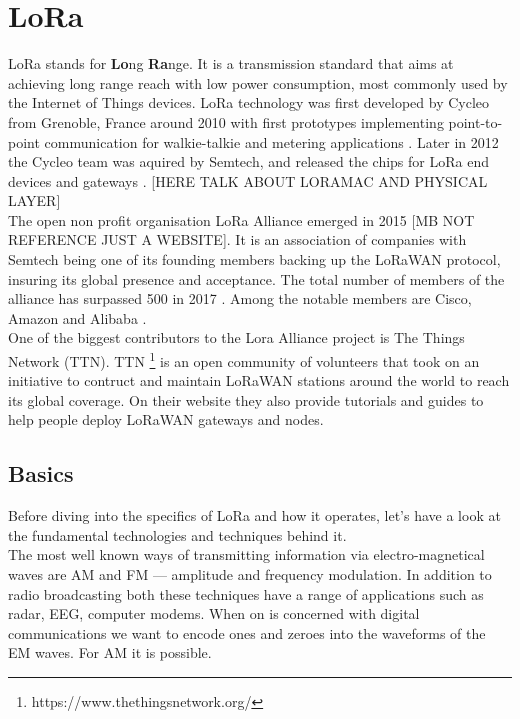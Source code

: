 \chapter{LoRa}

LoRa stands for \textbf{Lo}ng \textbf{Ra}nge. It is a transmission standard that aims at achieving long range reach with low power
consumption, most commonly used by the Internet of Things devices.
LoRa technology was first developed by Cycleo from Grenoble, France around 2010 with first prototypes implementing point-to-point communication for walkie-talkie and metering applications \cite{trinity_panel}. Later in 2012 the Cycleo team was aquired by Semtech, and released the chips for LoRa end devices and gateways \cite{origins}. [HERE TALK ABOUT LORAMAC AND PHYSICAL LAYER]\\

The open non profit organisation LoRa Alliance emerged in 2015\cite{alliance} [MB NOT REFERENCE JUST A WEBSITE]. 
It is an association of companies with Semtech being one of
its founding members \cite{alliance_founder} backing up the LoRaWAN protocol, insuring its
global presence and acceptance. The total number of members of the alliance has surpassed 500 in 2017 \cite{500_members}. Among the notable members are Cisco, Amazon and Alibaba \cite{alliance_members}.\\

One of the biggest contributors to the Lora Alliance project is The Things Network (TTN). TTN \footnote{https://www.thethingsnetwork.org/} is an open community of volunteers that took on an initiative to contruct and maintain LoRaWAN stations around the world to reach its global coverage. On their website they also provide tutorials and guides to help people deploy LoRaWAN gateways and nodes. 

\section{Basics}

Before diving into the specifics of LoRa and how it operates, let's have a look at the fundamental technologies and techniques behind it. \\

The most well known ways of transmitting information 
via electro-magnetical waves are AM and FM — amplitude and frequency modulation. In addition to radio broadcasting both these techniques have a range of applications such as radar, EEG, computer modems. When 
on is concerned with digital communications we want to 
encode ones and zeroes into the waveforms of the EM waves. For AM it is possible. \\

